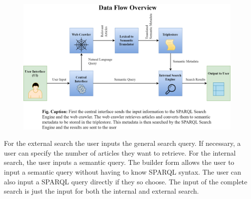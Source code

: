 \documentclass[12pt]{article}
\begin{document}
	\begin{figure}[h!]
		\centering
		\includegraphics[scale=0.21]{GeneralDiagram_vJSHS2.0}
	\end{figure}
	For the external search the user inputs the general search query. If necessary, a user can specify the number of articles they want to retrieve. For the internal search, the user inputs a semantic query. The builder form allows the user to input a semantic query without having to know SPARQL syntax. The user can also input a SPARQL query directly if they so choose. The input of the complete search is just the input for both the internal and external search.
\end{document}
